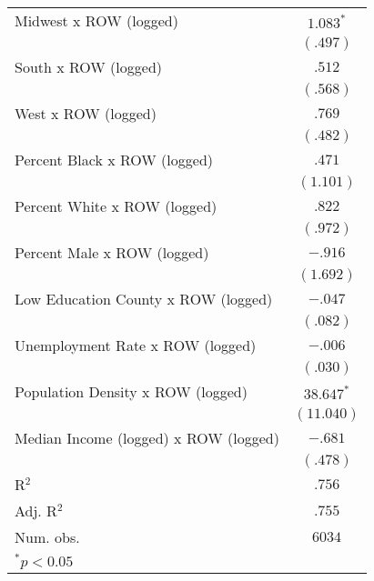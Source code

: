 \begin{tabular}{l c}
Midwest x ROW (logged)                & $1.083^{*}$   \\
                                      & $(.497)$      \\
South x ROW (logged)                  & $.512$        \\
                                      & $(.568)$      \\
West x ROW (logged)                   & $.769$        \\
                                      & $(.482)$      \\
Percent Black x ROW (logged)          & $.471$        \\
                                      & $(1.101)$     \\
Percent White x ROW (logged)          & $.822$        \\
                                      & $(.972)$      \\
Percent Male x ROW (logged)           & $-.916$       \\
                                      & $(1.692)$     \\
Low Education County x ROW (logged)   & $-.047$       \\
                                      & $(.082)$      \\
Unemployment Rate x ROW (logged)      & $-.006$       \\
                                      & $(.030)$      \\
Population Density x ROW (logged)     & $38.647^{*}$  \\
                                      & $(11.040)$    \\
Median Income (logged) x ROW (logged) & $-.681$       \\
                                      & $(.478)$      \\
\hline
R$^2$                                 & $.756$        \\
Adj. R$^2$                            & $.755$        \\
Num. obs.                             & $6034$        \\
\hline
\multicolumn{2}{l}{\scriptsize{$^{*}p<0.05$}}
\end{tabular}
